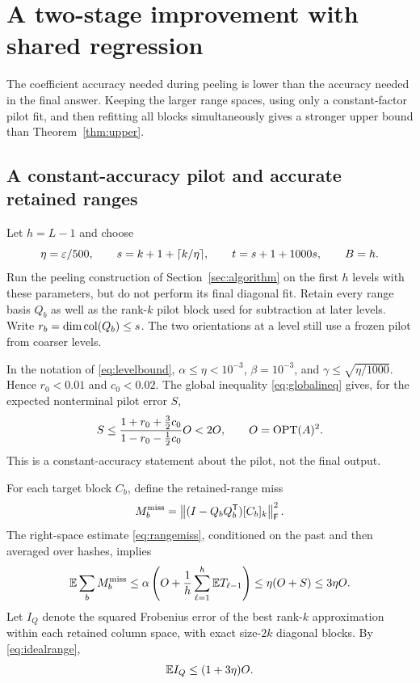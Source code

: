 \section{A two-stage improvement with shared regression}\label{sec:twostage}

The coefficient accuracy needed during peeling is lower than the accuracy
needed in the final answer. Keeping the larger range spaces, using only a
constant-factor pilot fit, and then refitting all blocks simultaneously gives
a stronger upper bound than Theorem~\ref{thm:upper}.

\subsection{A constant-accuracy pilot and accurate retained ranges}

Let $h=L-1$ and choose
\begin{equation}\label{eq:twostageparameters}
 \eta=\varepsilon/500,\qquad s=k+1+\lceil k/\eta\rceil,\qquad
 t=s+1+1000s,\qquad B=h.
\end{equation}
Run the peeling construction of Section~\ref{sec:algorithm} on the first
$h$ levels with these parameters, but do not perform its final diagonal fit.
Retain every range basis $Q_b$ as well as the rank-$k$ pilot block used for
subtraction at later levels. Write $r_b=\dim\operatorname{col}(Q_b)\le s$.
The two orientations at a level still use a frozen pilot from coarser levels.

In the notation of \eqref{eq:levelbound},
$\alpha\le\eta<10^{-3}$, $\beta=10^{-3}$, and
$\gamma\le\sqrt{\eta/1000}$. Hence $r_0<0.01$ and $c_0<0.02$.
The global inequality \eqref{eq:globalineq} gives, for the expected
nonterminal pilot error $S$,
\begin{equation}\label{eq:pilotconstant}
 S\le\frac{1+r_0+\tfrac32c_0}{1-r_0-\tfrac12c_0}O<2O,
 \qquad O=\operatorname{OPT}(A)^2.
\end{equation}
This is a constant-accuracy statement about the pilot, not the final output.

For each target block $C_b$, define the retained-range miss
\[
 M_b^{\rm miss}=\left\lVert (I-Q_bQ_b^{\mathsf T})[C_b]_k\right\rVert_\mathsf F^2.
\]
The right-space estimate \eqref{eq:rangemiss}, conditioned on the past and
then averaged over hashes, implies
\begin{equation}\label{eq:rangesum}
 \mathbb E\sum_b M_b^{\rm miss}
 \le\alpha\left(O+\frac1h\sum_{\ell=1}^h\mathbb E T_{\ell-1}\right)
 \le\eta(O+S)\le3\eta O.
\end{equation}
Let $I_Q$ denote the squared Frobenius error of the best rank-$k$ approximation within each
retained column space, with exact size-$2k$ diagonal blocks. By
\eqref{eq:idealrange},
\begin{equation}\label{eq:idealshared}
 \mathbb E I_Q\le(1+3\eta)O.
\end{equation}

